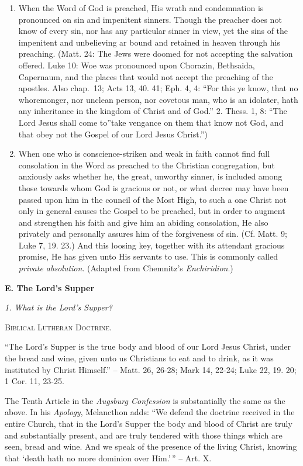 \documentclass[
]{book}
\begin{document}
\begin{enumerate}
\def\labelenumi{\arabic{enumi}.}
\item
  When the Word of God is preached, His wrath and condemnation is pronounced on sin and impenitent sinners. Though the preacher does not know of every sin, nor has any particular sinner in view, yet the sins of the impenitent and unbelieving ar bound and retained in heaven through his preaching. (Matt. 24: The Jews were doomed for not accepting the salvation offered. Luke 10: Woe was pronounced upon Chorazin, Bethsaida, Capernaum, and the places that would not accept the preaching of the apostles. Also chap.~13; Acts 13, 40. 41; Eph. 4, 4: ``For this ye know, that no whoremonger, nor unclean person, nor covetous man, who is an idolater, hath any inheritance in the kingdom of Christ and of God.'' 2. Thess. 1, 8: ``The Lord Jesus shall come to''take vengance on them that know not God, and that obey not the Gospel of our Lord Jesus Christ.'')
\item
  When one who is conscience-striken and weak in faith cannot find full consolation in the Word as preached to the Christian congregation, but anxiously asks whether he, the great, unworthy sinner, is included among those towards whom God is gracious or not, or what decree may have been passed upon him in the council of the Most High, to such a one Christ not only in general causes the Gospel to be preached, but in order to augment and strengthen his faith and give him an abiding consolation, He also privately and personally assures him of the forgiveness of sin. (Cf. Matt. 9; Luke 7, 19. 23.) And this loosing key, together with its attendant gracious promise, He has given unto His servants to use. This is commonly called \emph{private absolution}. (Adapted from Chemnitz's \emph{Enchiridion}.)
\end{enumerate}

\begin{center}
\textbf{E.  The Lord's Supper}

\textsl{1.  What is the Lord's Supper?}

\textsc{Biblical Lutheran Doctrine.}
\end{center}

``The Lord's Supper is the true body and blood of our Lord Jesus Christ, under the bread and wine, given unto us Christians to eat and to drink, as it was instituted by Christ Himself.'' -- Matt. 26, 26-28; Mark 14, 22-24; Luke 22, 19. 20; 1 Cor. 11, 23-25.

The Tenth Article in the \emph{Augsburg Confession} is substantially the same as the above. In his \emph{Apology}, Melancthon adds: ``We defend the doctrine received in the entire Church, that in the Lord's Supper the body and blood of Christ are truly and substantially present, and are truly tendered with those things which are seen, bread and wine. And we speak of the presence of the living Christ, knowing that `death hath no more dominion over Him.'\,'' -- Art. X.
\end{document}
